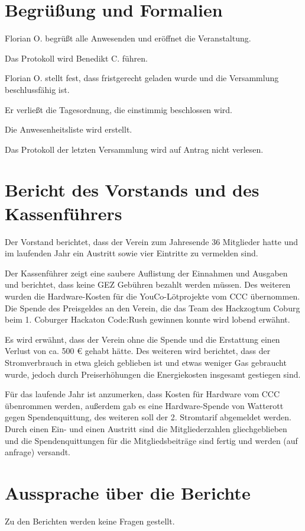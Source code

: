 \section{Begrüßung und Formalien}
Florian O. begrüßt alle Anwesenden und eröffnet die Veranstaltung. 

Das Protokoll wird Benedikt C. führen.

Florian O. stellt fest, dass fristgerecht geladen wurde und die Versammlung beschlussfähig ist. 

Er verließt die Tagesordnung, die einstimmig beschlossen wird.

Die Anwesenheitsliste wird erstellt.

Das Protokoll der letzten Versammlung wird auf Antrag nicht verlesen. 


\section{Bericht des Vorstands und des Kassenführers}
Der Vorstand berichtet, dass der Verein zum Jahresende 36 Mitglieder hatte und im laufenden Jahr ein Austritt sowie vier Eintritte zu vermelden sind.

Der Kassenführer zeigt eine saubere Auflistung der Einnahmen und Ausgaben und berichtet, dass keine GEZ Gebühren bezahlt werden müssen.
Des weiteren wurden die Hardware-Kosten für die YouCo-Lötprojekte vom CCC übernommen.
Die Spende des Preisgeldes an den Verein, die das Team des Hackzogtum Coburg beim 1. Coburger Hackaton Code:Rush gewinnen konnte wird lobend erwähnt.

Es wird erwähnt, dass der Verein ohne die Spende und die Erstattung einen Verlust von ca. 500 € gehabt hätte.
Des weiteren wird berichtet, dass der Stromverbrauch in etwa gleich geblieben ist und etwas weniger Gas gebraucht wurde, jedoch durch Preiserhöhungen die Energiekosten insgesamt gestiegen sind.

Für das laufende Jahr ist anzumerken, dass Kosten für Hardware vom CCC übenrommen werden, außerdem gab es eine Hardware-Spende von Watterott gegen Spendenquittung, des weiteren soll der 2. Stromtarif abgemeldet werden. Durch einen Ein- und einen Austritt sind die Mitgliederzahlen gliechgeblieben und die Spendenquittungen für die Mitgliedsbeiträge sind fertig und werden (auf anfrage) versandt.


\section{Aussprache über die Berichte}
Zu den Berichten werden keine Fragen gestellt.

